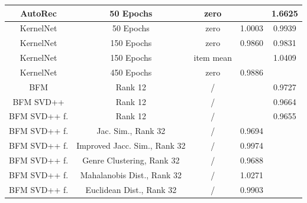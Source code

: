 \documentclass[10pt,conference,compsocconf]{IEEEtran}
\begin{document}
\begin{table}
{\begin{tabular}{|| c | c | c | c | c ||}
                AutoRec              & 50 Epochs                             & zero                    &                        & 1.6625                  \\
                \hline
                KernelNet            & 50 Epochs                             & zero                    & 1.0003                 & 0.9939                  \\
                KernelNet            & 150 Epochs                            & zero                    & 0.9860                 & 0.9831                  \\
                KernelNet            & 150 Epochs                            & item mean               &                        & 1.0409                  \\
                KernelNet            & 450 Epochs                            & zero                    & 0.9886                 &                         \\
                \hline
                BFM                  & Rank 12                               & /                       &                        & 0.9727                  \\
                BFM SVD++            & Rank 12                               & /                       &                        & 0.9664                  \\
                BFM SVD++ f.         & Rank 12                               & /                       &                        & 0.9655                  \\
                BFM SVD++ f.         & Jac. Sim., Rank 32                    & /                       & 0.9694                 &                         \\
                BFM SVD++ f.         & Improved Jacc. Sim., Rank 32          & /                       & 0.9974                 &                         \\
                BFM SVD++ f.         & Genre Clustering, Rank 32             & /                       & 0.9688                 &                         \\
                BFM SVD++ f.         & Mahalanobis Dist., Rank 32            & /                       & 1.0271                 &                         \\
                BFM SVD++ f.         & Euclidean Dist., Rank 32              & /                       & 0.9903                 &                         \\

\end{tabular}}
\end{table}
\end{document}
